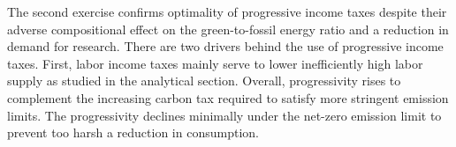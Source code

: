  

  



The second exercise confirms optimality of progressive income taxes despite their adverse compositional effect on the green-to-fossil energy ratio and a reduction in demand for research. There are two drivers behind the use of progressive income taxes.
First, labor income taxes mainly serve to lower inefficiently high labor supply as studied in the analytical section.
Overall, progressivity rises to complement the increasing carbon tax required to satisfy more stringent emission limits. %
The progressivity declines minimally under the net-zero emission limit to prevent too harsh a reduction in consumption. 

